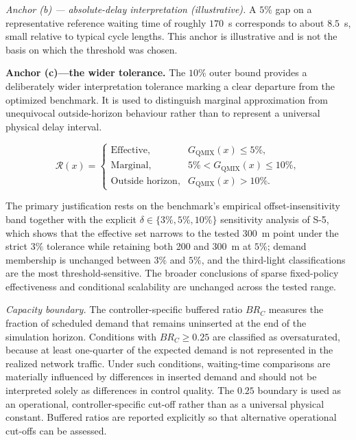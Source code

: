 \documentclass[12pt]{article}
\begin{document}
\textit{Anchor (b) --- absolute-delay interpretation (illustrative).} A $5\%$ gap on
a representative reference waiting time of roughly $170$~s corresponds to about
$8.5$~s, small relative to typical cycle lengths. This anchor is illustrative and is
not the basis on which the threshold was chosen.

\textbf{Anchor (c)---the wider tolerance.}
The $10\%$ outer bound provides a deliberately wider interpretation
tolerance marking a clear departure from the optimized benchmark. It is
used to distinguish marginal approximation from unequivocal
outside-horizon behaviour rather than to represent a universal physical
delay interval.

\begin{equation}
\mathcal{R}(x)=
\begin{cases}
\text{Effective},  & G_{\mathrm{QMIX}}(x)\leq 5\%,\\
\text{Marginal},   & 5\% < G_{\mathrm{QMIX}}(x)\leq 10\%,\\
\text{Outside horizon}, & G_{\mathrm{QMIX}}(x)>10\% .
\end{cases}
\label{eq:reg}
\end{equation}

The primary justification rests on the benchmark's empirical
offset-insensitivity band together with the explicit
$\delta\in\{3\%,5\%,10\%\}$ sensitivity analysis of S-5, which shows that the
effective set narrows to the tested $300$~m point under the strict $3\%$
tolerance while retaining both 200 and 300~m at $5\%$; demand membership is
unchanged between $3\%$ and $5\%$, and the third-light classifications are the
most threshold-sensitive. The broader conclusions of sparse fixed-policy
effectiveness and conditional scalability are unchanged across the tested range.

\textit{Capacity boundary.}
The controller-specific buffered ratio $BR_C$ measures the fraction of
scheduled demand that remains uninserted at the end of the simulation
horizon. Conditions with $BR_C\geq0.25$ are classified as oversaturated,
because at least one-quarter of the expected demand is not represented in
the realized network traffic. Under such conditions, waiting-time
comparisons are materially influenced by differences in inserted demand
and should not be interpreted solely as differences in control quality.
The $0.25$ boundary is used as an operational, controller-specific cut-off
rather than as a universal physical constant. Buffered ratios are reported
explicitly so that alternative operational cut-offs can be assessed.
\end{document}
